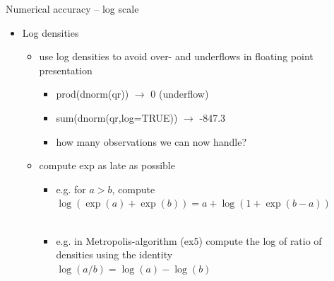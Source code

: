\documentclass[finnish,english,t]{beamer}
\begin{document}
\begin{frame}{Numerical accuracy -- log scale}

  \begin{itemize}
  \item Log densities
    \begin{itemize}
    \item use log densities to avoid over- and underflows in floating
      point presentation
      \begin{itemize}
      \item {\color{navyblue} prod(dnorm(qr)) $\rightarrow$} {\color{red} 0 (underflow)}
      \item {\color{navyblue} sum(dnorm(qr,log=TRUE)) $\rightarrow$} {\color{darkgreen} -847.3}
      \item<2-> how many observations we can now handle? %
    \end{itemize}
    \item<3-> compute exp as late as possible
      \begin{itemize}
      \item<4-> e.g. for $a>b$, compute $\log(\exp(a)+\exp(b)) = a + \log(1+\exp(b-a))$\\
        \\
      \item<7-> e.g. in Metropolis-algorithm (ex5) compute the log of ratio of densities using the identity\\
        $\log(a/b)=\log(a)-\log(b)$
    \end{itemize}
    \end{itemize}
  \end{itemize}

\end{frame}
\end{document}
